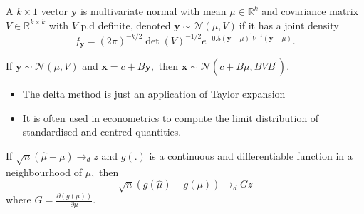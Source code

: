 \documentclass[notes=show]{beamer}
\begin{document}
\begin{frame}%


\begin{definition}
A $k\times 1$ vector $\mathbf{y}$ is multivariate normal with mean $\mu \in 
\mathbb{R}^{k}$ and covariance matrix $V\in \mathbb{R}^{k\times k}$ with $V$
p.d definite, denoted $\mathbf{y\sim }\mathcal{N}\left( \mu ,V\right) \ $if
it has a joint density%
\begin{equation*}
f_{\mathbf{y}}=\left( 2\pi \right) ^{-k/2}\det \left( V\right)
^{-1/2}e^{-0.5\left( \mathbf{y-}\mu \right) ^{\prime }V^{-1}\left( \mathbf{y-%
}\mu \right) }.
\end{equation*}
\end{definition}

\begin{definition}
If $\mathbf{y\sim }\mathcal{N}\left( \mu ,V\right) $ and $\mathbf{x=}c+B%
\mathbf{y,}$ then $\mathbf{x\sim }\mathcal{N}\left( c+B\mu ,BVB^{\prime
}\right) .$
\end{definition}

\end{frame}%

\begin{frame}%


\begin{itemize}
\item The delta method is just an application of Taylor expansion

\item It is often used in econometrics to compute the limit distribution of
standardised and centred quantities.
\end{itemize}

\begin{theorem}
If $\sqrt{n}\left( \hat{\mu}-\mu \right) \rightarrow _{d}z$ and $g\left(
.\right) $ is a continuous and differentiable function in a neighbourhood of 
$\mu ,$ then 
\begin{equation*}
\sqrt{n}\left( g\left( \hat{\mu}\right) -g\left( \mu \right) \right)
\rightarrow _{d}Gz
\end{equation*}%
where $G=\frac{\partial \left( g\left( \mu \right) \right) }{\partial \mu }.$
\end{theorem}

\end{frame}%
\end{document}

